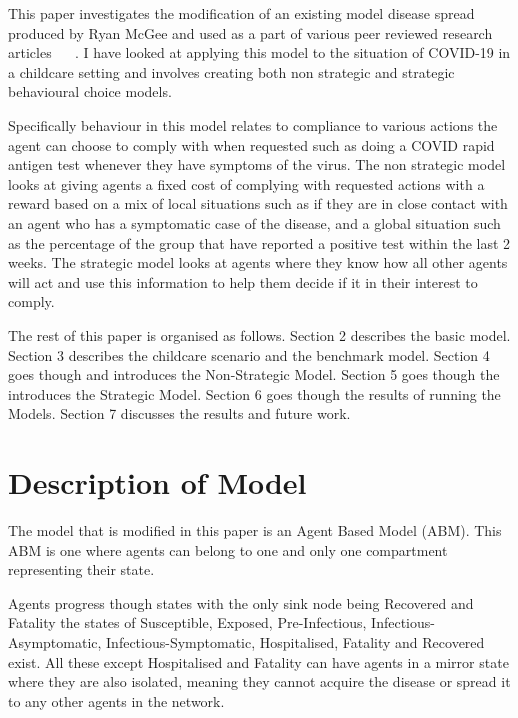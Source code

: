 \documentclass{article}
\begin{document}
This paper investigates the modification of an existing model disease spread produced by Ryan McGee and used as a part of various peer reviewed research articles ~\cite{mcgee_homburger_williams_bergstrom_zhou_2021} ~\cite{mcgee_homburger_williams_bergstrom_zhou_2021_2}. 
I have looked at applying this model to the situation of COVID-19 in a childcare setting and involves creating both non strategic and strategic behavioural choice models. \newline

Specifically behaviour in this model relates to compliance to various actions the agent can choose to comply with when requested such as doing a COVID rapid antigen test whenever they have symptoms of the virus. The non strategic model looks at giving agents a fixed cost of complying with requested actions with a reward based on a mix of local situations such as if they are in close contact with an agent who has a symptomatic case of the disease, and a global situation such as the percentage of the group that have reported a positive test within the last 2 weeks. The strategic model looks at agents where they know how all other agents will act and use this information to help them decide if it in their interest to comply.\newline

The rest of this paper is organised as follows. Section 2 describes the basic model. Section 3 describes the childcare scenario and the benchmark model. Section 4 goes though and introduces the Non-Strategic Model. Section 5 goes though the introduces the Strategic Model. Section 6 goes though the results of running the Models. Section 7 discusses the results and future work.


\section{Description of Model \label{description}}
The model that is modified in this paper is an Agent Based Model (ABM). This ABM is one where agents can belong to one and only one compartment representing their state. 

Agents progress though states with the only sink node being Recovered and Fatality
the states of Susceptible, Exposed, Pre-Infectious, Infectious-Asymptomatic, Infectious-Symptomatic, Hospitalised, Fatality and Recovered exist. All these except Hospitalised and Fatality can have agents in a mirror state where they are also isolated, meaning they cannot acquire the disease or spread it to any other agents in the network.
\end{document}
